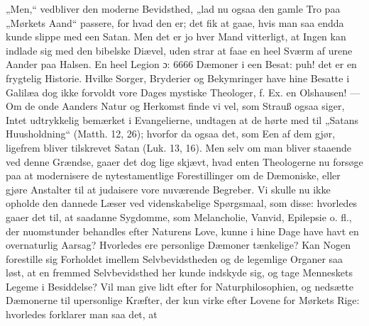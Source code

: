 \documentclass[12pt,a4paper]{book}
\begin{document}
„Men,“ vedbliver den moderne Bevidsthed, „lad nu ogsaa den gamle Tro paa „Mørkets Aand“
passere, for hvad den er; det fik at gaae, hvis man saa endda kunde slippe med een Satan.
Men det er jo hver Mand vitterligt, at Ingen kan indlade sig med den bibelske Diævel, uden
strar at faae en heel Sværm af urene Aander paa Halsen. En heel Legion ɔ: 6666 Dæmoner i
een Besat: puh! det er en frygtelig Historie. Hvilke Sorger, Bryderier og Bekymringer have
hine Besatte i Galilæa dog ikke forvoldt vore Dages mystiske Theologer, f. Ex. en
Olshausen! --- Om de onde Aanders Natur og Herkomst finde vi vel, som Strauß ogsaa siger,
Intet udtrykkelig bemærket i Evangelierne, undtagen at de hørte med til „Satans
Huusholdning“ (Matth. 12, 26); hvorfor da ogsaa det, som Een af dem gjør, ligefrem bliver
tilskrevet Satan (Luk. 13, 16). Men selv om man bliver staaende ved denne Grændse, gaaer
det dog lige skjævt, hvad enten Theologerne nu forsøge paa at modernisere de
nytestamentlige Forestillinger om de Dæmoniske, eller gjøre Anstalter til at judaisere
vore nuværende Begreber. Vi skulle nu ikke opholde den dannede Læser ved videnskabelige
Spørgsmaal, som disse: hvorledes gaaer det til, at saadanne Sygdomme, som Melancholie,
Vanvid, Epilepsie o. fl., der nuomstunder behandles efter Naturens Love, kunne i hine Dage
have havt en overnaturlig Aarsag? Hvorledes ere personlige Dæmoner tænkelige? Kan Nogen
forestille sig Forholdet imellem Selvbevidstheden og de legemlige Organer saa løst, at en
fremmed Selvbevidsthed her kunde indskyde sig, og tage Menneskets Legeme i Besiddelse? Vil
man give lidt efter for Naturphilosophien, og nedsætte Dæmonerne til upersonlige Kræfter,
der kun virke efter Lovene for Mørkets Rige: hvorledes forklarer man saa det, at
\end{document}

